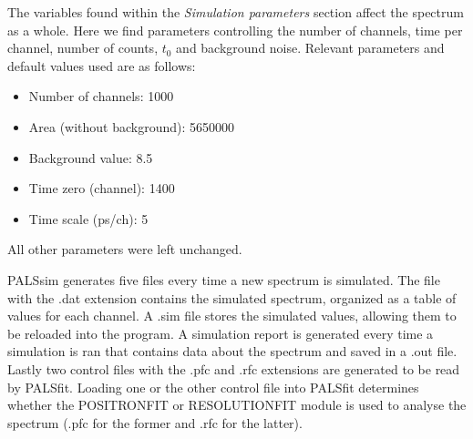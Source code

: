 The variables found within the \textit{Simulation parameters} section affect the spectrum as a whole. Here we find parameters controlling the number of channels, time per channel, number of counts, $t_0$ and background noise. Relevant parameters and default values used are as follows:

\begin{itemize}
    \item Number of channels: 1000 
    \item Area (without background): 5650000 
    \item Background value: 8.5 
    \item Time zero (channel): 1400 
    \item Time scale (ps/ch): 5 
\end{itemize}
All other parameters were left unchanged.

PALSsim generates five files every time a new spectrum is simulated. The file with the .dat extension contains the simulated spectrum, organized as a table of values for each channel. A .sim file stores the simulated values, allowing them to be reloaded into the program. A simulation report is generated every time a simulation is ran that contains data about the spectrum and saved in a .out file. Lastly two control files with the .pfc and .rfc extensions are generated to be read by PALSfit. Loading one or the other control file into PALSfit determines whether the POSITRONFIT or RESOLUTIONFIT module is used to analyse the spectrum (.pfc for the former and .rfc for the latter).

